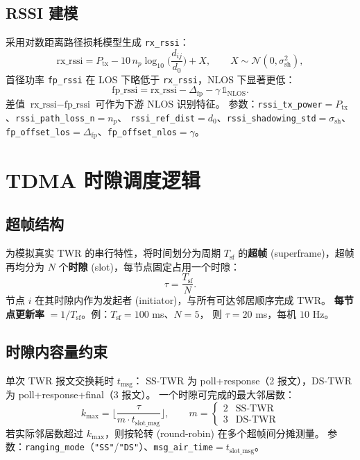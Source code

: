 \documentclass[11pt,a4paper]{article}
\begin{document}
\subsection{RSSI 建模}
采用对数距离路径损耗模型生成 \texttt{rx\_rssi}：
$$
\text{rx\_rssi} = P_{\text{tx}} - 10\,n_p\log_{10}\!\Big(\frac{d_{ij}}{d_0}\Big)
                 + X,\qquad X\sim\mathcal{N}(0,\sigma_{\text{sh}}^2),
$$
首径功率 \texttt{fp\_rssi} 在 LOS 下略低于 \texttt{rx\_rssi}，NLOS 下显著更低：
$$
\text{fp\_rssi} = \text{rx\_rssi} - \Delta_{\text{fp}}
                  - \gamma\,\mathbb{1}_{\text{NLOS}}.
$$
差值 $\text{rx\_rssi}-\text{fp\_rssi}$ 可作为下游 NLOS 识别特征。
参数：\texttt{rssi\_tx\_power}$=P_{\text{tx}}$、\texttt{rssi\_path\_loss\_n}$=n_p$、
\texttt{rssi\_ref\_dist}$=d_0$、\texttt{rssi\_shadowing\_std}$=\sigma_{\text{sh}}$、
\texttt{fp\_offset\_los}$=\Delta_{\text{fp}}$、\texttt{fp\_offset\_nlos}$=\gamma$。

\section{TDMA 时隙调度逻辑}\label{sec:tdma}
\subsection{超帧结构}
为模拟真实 TWR 的串行特性，将时间划分为周期 $T_{\text{sf}}$ 的\textbf{超帧}
(superframe)，超帧再均分为 $N$ 个\textbf{时隙} (slot)，每节点固定占用一个时隙：
$$ \tau = \frac{T_{\text{sf}}}{N}. $$
节点 $i$ 在其时隙内作为发起者 (initiator)，与所有可达邻居顺序完成 TWR。
\textbf{每节点更新率} $= 1/T_{\text{sf}}$。例：$T_{\text{sf}}=100$ ms、$N=5$，
则 $\tau=20$ ms，每机 $10$ Hz。

\subsection{时隙内容量约束}
单次 TWR 报文交换耗时 $t_{\text{msg}}$：
SS-TWR 为 poll+response（2 报文），DS-TWR 为 poll+response+final（3 报文）。
一个时隙可完成的最大邻居数：
$$
k_{\max} = \Big\lfloor \frac{\tau}{m\cdot t_{\text{slot\_msg}}} \Big\rfloor,
\qquad m=\begin{cases}2 & \text{SS-TWR}\\ 3 & \text{DS-TWR}\end{cases}
$$
若实际邻居数超过 $k_{\max}$，则按轮转 (round-robin) 在多个超帧间分摊测量。
参数：\texttt{ranging\_mode}（\texttt{"SS"}/\texttt{"DS"}）、\texttt{msg\_air\_time}$=t_{\text{slot\_msg}}$。
\end{document}
